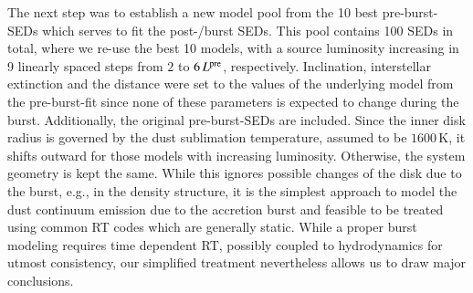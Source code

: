 The next step was to establish a new model pool from the 10 best pre-burst-SEDs which serves to fit the post-/burst SEDs. This pool contains 100 SEDs in total, where we re-use the best 10 models, with a source luminosity increasing in 9 linearly spaced steps from $2$ to $6\,L^{\rm pre}$, respectively. %
Inclination, interstellar extinction and the distance
were set to the values of the underlying model from the pre-burst-fit
since none of these parameters is expected to change during the burst.
Additionally, the original pre-burst-SEDs are included. 
Since the inner disk radius is governed by the dust sublimation temperature, assumed to be $1600\,$K, it shifts outward for those models with increasing luminosity. Otherwise, the system geometry is kept the same.
While this ignores possible changes of the disk due to the burst, e.g., in the density structure, it is the simplest approach to model the dust continuum emission due to the accretion burst and feasible to be treated using common RT codes which are generally static. 
While a proper burst modeling requires time dependent RT, possibly coupled to hydrodynamics for utmost consistency, our simplified treatment nevertheless allows us to draw major conclusions.

